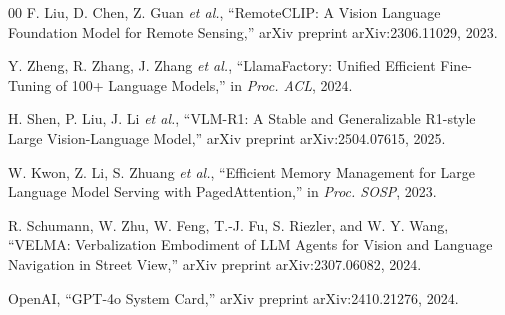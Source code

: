 \documentclass[conference]{IEEEtran}
\begin{document}
\begin{thebibliography}{00}
F. Liu, D. Chen, Z. Guan \textit{et al.}, ``RemoteCLIP: A Vision Language Foundation Model for Remote Sensing,'' arXiv preprint arXiv:2306.11029, 2023.

Y. Zheng, R. Zhang, J. Zhang \textit{et al.}, ``LlamaFactory: Unified Efficient Fine-Tuning of 100+ Language Models,'' in \textit{Proc. ACL}, 2024.

H. Shen, P. Liu, J. Li \textit{et al.}, ``VLM-R1: A Stable and Generalizable R1-style Large Vision-Language Model,'' arXiv preprint arXiv:2504.07615, 2025.

W. Kwon, Z. Li, S. Zhuang \textit{et al.}, ``Efficient Memory Management for Large Language Model Serving with PagedAttention,'' in \textit{Proc. SOSP}, 2023.

R. Schumann, W. Zhu, W. Feng, T.-J. Fu, S. Riezler, and W. Y. Wang, ``VELMA: Verbalization Embodiment of LLM Agents for Vision and Language Navigation in Street View,'' arXiv preprint arXiv:2307.06082, 2024.

OpenAI, ``GPT-4o System Card,'' arXiv preprint arXiv:2410.21276, 2024.

\end{thebibliography}
\end{document}
